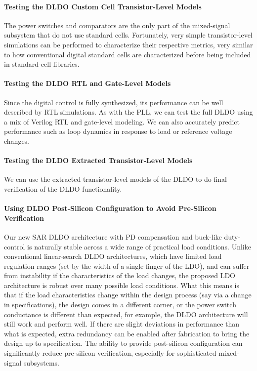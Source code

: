 \paragraph{Testing the DLDO Custom Cell Transistor-Level Models}
The power switches and comparators are the only part of the mixed-signal
subsystem that do not use standard cells. Fortunately, very simple
transistor-level simulations can be performed to characterize their
respective metrics, very similar to how conventional digital standard
cells are characterized before being included in standard-cell libraries.

\paragraph{Testing the DLDO RTL and Gate-Level Models}
Since the digital control is fully synthesized, its performance can be
well described by RTL simulations. As with the PLL, we can test the full
DLDO using a mix of Verilog RTL and gate-level modeling. We can also
accurately predict performance such as loop dynamics in response to load
or reference voltage changes. 

\paragraph{Testing the DLDO Extracted Transistor-Level Models}
We can use the extracted transistor-level models of the DLDO to do final
verification of the DLDO functionality. 

\paragraph{Using DLDO Post-Silicon Configuration to Avoid Pre-Silicon Verification}
Our new SAR DLDO architecture with PD compensation and buck-like
duty-control is naturally stable across a wide range of practical load
conditions. Unlike conventional linear-search DLDO architectures, which
have limited load regulation ranges (set by the width of a single finger
of the LDO), and can suffer from instability if the characteristics of
the load changes, the proposed LDO architecture is robust over many
possible load conditions. What this means is that if the load
characteristics change within the design process (say via a change in
specifications), the design comes in a different corner, or the power
switch conductance is different than expected, for example, the DLDO
architecture will still work and perform well. If there are slight
deviations in performance than what is expected, extra redundancy can be
enabled after fabrication to bring the design up to specification. The
ability to provide post-silicon configuration can significantly reduce
pre-silicon verification, especially for sophisticated mixed-signal
subsystems.

